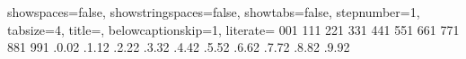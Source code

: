 {	showspaces=false,								%
	showstringspaces=false,							%
	showtabs=false,									%
	stepnumber=1,									%
	tabsize=4,										%
	title=\lstname,									%
	belowcaptionskip=1\baselineskip,				%
    literate=%
		{0}{{\textcolor{mypurple}{0}}}{1}%
		{1}{{\textcolor{mypurple}{1}}}{1}%
		{2}{{\textcolor{mypurple}{2}}}{1}%
		{3}{{\textcolor{mypurple}{3}}}{1}%
		{4}{{\textcolor{mypurple}{4}}}{1}%
		{5}{{\textcolor{mypurple}{5}}}{1}%
		{6}{{\textcolor{mypurple}{6}}}{1}%
		{7}{{\textcolor{mypurple}{7}}}{1}%
		{8}{{\textcolor{mypurple}{8}}}{1}%
		{9}{{\textcolor{mypurple}{9}}}{1}%
		{.0}{{\textcolor{mypurple}{.0}}}{2}%
		{.1}{{\textcolor{mypurple}{.1}}}{2}%
		{.2}{{\textcolor{mypurple}{.2}}}{2}%
		{.3}{{\textcolor{mypurple}{.3}}}{2}%
		{.4}{{\textcolor{mypurple}{.4}}}{2}%
		{.5}{{\textcolor{mypurple}{.5}}}{2}%
		{.6}{{\textcolor{mypurple}{.6}}}{2}%
		{.7}{{\textcolor{mypurple}{.7}}}{2}%
		{.8}{{\textcolor{mypurple}{.8}}}{2}%
		{.9}{{\textcolor{mypurple}{.9}}}{2}%
}

\makeatletter\newcommand{\currentlabel}{\@currentlabelname}\makeatother
\newcommand{\formatsection}[1]{
	\ifthenelse{\equal{#1}{center}}{
		\titleformat{\section}{\normalfont\Large\bfseries\centering}{\thesection}{1em}{}
	}{
		\ifthenelse{\equal{#1}{right}}{
			\titleformat{\section}{\normalfont\Large\bfseries\raggedleft}{\thesection}{1em}{}
		}{
			\ifthenelse{\equal{#1}{left}}{
				\titleformat{\section}{\normalfont\Large\bfseries\raggedright}{\thesection}{1em}{}
			}{
			}
		}
	}
}

